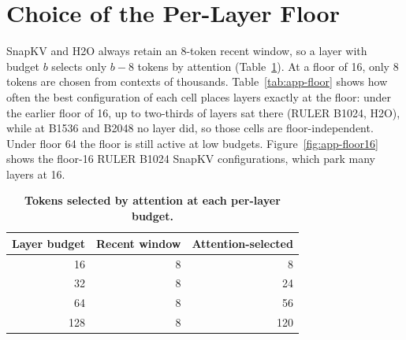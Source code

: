 \section{Choice of the Per-Layer Floor}
\label{app:floor}

SnapKV and H2O always retain an 8-token recent window, so a layer with budget $b$ selects only $b-8$ tokens by attention (Table~\ref{tab:app-floor-tokens}). At a floor of 16, only 8 tokens are chosen from contexts of thousands. Table~\ref{tab:app-floor} shows how often the best configuration of each cell places layers exactly at the floor: under the earlier floor of 16, up to two-thirds of layers sat there (RULER B1024, H2O), while at B1536 and B2048 no layer did, so those cells are floor-independent. Under floor 64 the floor is still active at low budgets. Figure~\ref{fig:app-floor16} shows the floor-16 RULER B1024 SnapKV configurations, which park many layers at 16.

\begin{table}[t]
  \centering
  \footnotesize
  \setlength{\tabcolsep}{4pt}
  \begin{tabular}{@{}r r r@{}}
    \toprule
    Layer budget & Recent window & Attention-selected \\
    \midrule
    16 & 8 & 8 \\
    32 & 8 & 24 \\
    64 & 8 & 56 \\
    128 & 8 & 120 \\
    \bottomrule
  \end{tabular}
  \caption{\textbf{Tokens selected by attention at each per-layer budget.}}
  \label{tab:app-floor-tokens}
\end{table}

